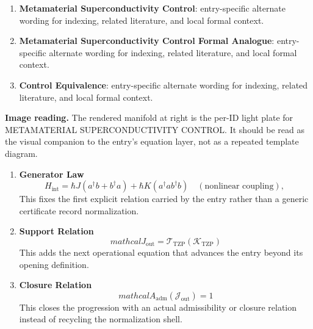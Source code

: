 \begin{enumerate}[leftmargin=1.6em,itemsep=6pt,topsep=4pt]
\item \textbf{Metamaterial Superconductivity Control}: entry-specific alternate wording for indexing, related literature, and local formal context.
\item \textbf{Metamaterial Superconductivity Control Formal Analogue}: entry-specific alternate wording for indexing, related literature, and local formal context.
\item \textbf{Control Equivalence}: entry-specific alternate wording for indexing, related literature, and local formal context.
\end{enumerate}

\begin{samepage}
\noindent\begin{minipage}[t]{0.45\linewidth}
\vspace{0pt}
\raggedright
\scriptsize\textbf{Image reading.} The rendered manifold at right is the per-ID light plate for METAMATERIAL SUPERCONDUCTIVITY CONTROL. It should be read as the visual companion to the entry's equation layer, not as a repeated template diagram.\par
\end{minipage}\hfill
\begin{minipage}[t]{0.53\linewidth}
\vspace*{-0.10in}
\raggedright
{}
\end{minipage}
\end{samepage}

\clearpage


\begin{enumerate}[leftmargin=1.6em,itemsep=9pt,topsep=6pt]
\item \textbf{Generator Law}
\[
H_{\text{int}} = \hbar J (a^\dagger b + b^\dagger a) + \hbar K (a^\dagger a b^\dagger b) \quad(\text{nonlinear coupling}), 
\]
This fixes the first explicit relation carried by the entry rather than a generic certificate record normalization.

\item \textbf{Support Relation}
\[
mathcal{J}_{\mathrm{out}} = \mathcal{T}_{\mathrm{TZP}}\!\left(\mathcal{K}_{\mathrm{TZP}}\right)
\]
This adds the next operational equation that advances the entry beyond its opening definition.

\item \textbf{Closure Relation}
\[
mathcal{A}_{\mathrm{adm}}\!\left(\mathcal{J}_{\mathrm{out}}\right)=1
\]
This closes the progression with an actual admissibility or closure relation instead of recycling the normalization shell.
\end{enumerate}

